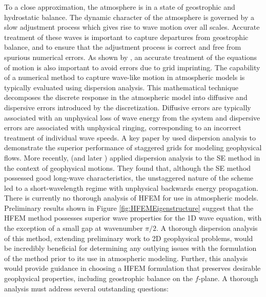 \documentclass[11pt]{article}
\begin{document}
To a close approximation, the atmosphere is in a state of geostrophic and hydrostatic balance.  The dynamic character of the atmosphere is governed by a slow adjustment process which gives rise to wave motion over all scales.  Accurate treatment of these waves is important to capture departures from geostrophic balance, and to ensure that the adjustment process is correct and free from spurious numerical errors.  As shown by \cite{PHLCJMATRDN2010JAMES}, an accurate treatment of the equations of motion is also important to avoid errors due to grid imprinting.  The capability of a numerical method to capture wave-like motion in atmospheric models is typically evaluated using dispersion analysis.  This mathematical technique decomposes the discrete response in the atmospheric model into diffusive and dispersive errors introduced by the discretization.  Diffusive errors are typically associated with an unphysical loss of wave energy from the system and dispersive errors are associated with unphysical ringing, corresponding to an incorrect treatment of individual wave speeds.  A key paper by \cite{DAR1994MWR} used dispersion analysis to demonstrate the superior performance of staggered grids for modeling geophysical flows.  More recently, \cite{MAHAW2009SIAMJNA} (and later \cite{TMASJT2012QJRMS}) applied dispersion analysis to the SE method in the context of geophysical motions.  They found that, although the SE method possessed good long-wave characteristics, the unstaggered nature of the scheme led to a short-wavelength regime with unphysical backwards energy propagation.  There is currently no thorough analysis of HFEM for use in atmospheric models.  Preliminary results shown in Figure \ref{fig:HFEMEigenstructure} suggest that the HFEM method possesses superior wave properties for the 1D wave equation, with the exception of a small gap at wavenumber $\pi / 2$.  A thorough dispersion analysis of this method, extending preliminary work to 2D geophysical problems, would be incredibly beneficial for determining any outlying issues with the formulation of the method prior to its use in atmospheric modeling.  Further, this analysis would provide guidance in choosing a HFEM formulation that preserves desirable geophysical properties, including geostrophic balance on the $f$-plane.  A thorough analysis must address several outstanding questions:
\end{document}
